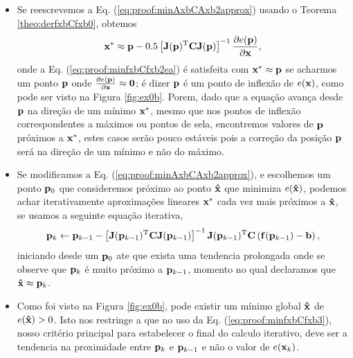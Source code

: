 \begin{myproofT}
\begin{itemize}
\item Se reescrevemos a Eq. (\ref{eq:proof:minAxbCAxb2approx}) usando o Teorema \ref{theo:derfxbCfxb0},
obtemos
\begin{equation}\label{eq:proof:minfxbCfxb2ea}
\VECTOR{x}^* \approx \VECTOR{p} -
0.5 \left[ \MATRIX{J}(\VECTOR{p})^{\transpose}\MATRIX{C} \MATRIX{J}(\VECTOR{p}) \right]^{-1}
\frac{\partial e(\VECTOR{p})}{\partial \VECTOR{x} },
\end{equation}
onde a Eq. (\ref{eq:proof:minfxbCfxb2ea}) é satisfeita 
com $\VECTOR{x}^* \approx \VECTOR{p}$
se acharmos um  ponto $\VECTOR{p}$ onde  
$\frac{\partial e(\VECTOR{p})}{\partial \VECTOR{x} }\approx \VECTOR{0}$; 
é dizer $\VECTOR{p}$ é um ponto de inflexão de $e(\VECTOR{x})$, como pode ser visto na Figura \ref{fig:ex0b}.
Porem, dado que a equação avança desde $\VECTOR{p}$ na direção de um mínimo $\VECTOR{x}^*$, 
mesmo que nos pontos de inflexão correspondentes a máximos ou pontos de sela,
encontremos valores de $\VECTOR{p}$ próximos a $\VECTOR{x}^*$,
 estes casos serão pouco estáveis pois
a correção da posição $\VECTOR{p}$ será na direção de um mínimo e não do máximo.

\item Se modificamos a Eq. (\ref{eq:proof:minAxbCAxb2approx}), e escolhemos um ponto  
$\VECTOR{p}_0$ que consideremos próximo ao ponto $\VECTOR{\hat{x}}$ que minimiza $e(\VECTOR{\hat{x}})$,
podemos achar iterativamente aproximações lineares $\VECTOR{x}^*$ cada vez mais próximos a  $\VECTOR{\hat{x}}$,
se usamos a seguinte equação iterativa,
\begin{equation}\label{eq:proof:minfxbCfxb3}
\VECTOR{p}_{k} \leftarrow \VECTOR{p}_{k-1} -
\left[ \MATRIX{J}(\VECTOR{p}_{k-1})^{\transpose}\MATRIX{C} \MATRIX{J}(\VECTOR{p}_{k-1}) \right]^{-1}
\MATRIX{J}(\VECTOR{p}_{k-1})^{\transpose}\MATRIX{C} \left(\VECTOR{f}(\VECTOR{p}_{k-1})-\VECTOR{b}\right),
\end{equation}
iniciando desde um $\VECTOR{p}_{0}$ 
ate que exista uma tendencia prolongada onde se observe que $\VECTOR{p}_{k}$ é muito próximo a $\VECTOR{p}_{k-1}$,
momento no qual declaramos que $\VECTOR{\hat{x}} \approx \VECTOR{p}_{k}$.
\item Como foi visto na Figura  \ref{fig:ex0b},
pode existir um mínimo global $\VECTOR{\hat{x}}$ de $e(\VECTOR{\hat{x}})>0$.
Isto nos restringe a que no uso da Eq. (\ref{eq:proof:minfxbCfxb3}),
nosso critério principal para estabelecer o final do calculo iterativo,
deve ser a tendencia na  proximidade entre $\VECTOR{p}_{k}$ e $\VECTOR{p}_{k-1}$ 
e não o valor de $e(\VECTOR{x}_k)$.
\end{itemize}~


\end{myproofT}
